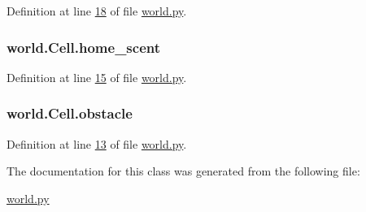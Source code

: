 Definition at line \hyperlink{world_8py_source_l00018}{18} of file \hyperlink{world_8py_source}{world.\+py}.

\hypertarget{classworld_1_1Cell_a0ef4adaadea1ccdcd1b61c70e242aa4a}{
\subsubsection[{home\+\_\+scent}]{\setlength{\rightskip}{0pt plus 5cm}world.\+Cell.\+home\+\_\+scent}}\label{classworld_1_1Cell_a0ef4adaadea1ccdcd1b61c70e242aa4a}


Definition at line \hyperlink{world_8py_source_l00015}{15} of file \hyperlink{world_8py_source}{world.\+py}.

\hypertarget{classworld_1_1Cell_aeaf17388b8c9000fe612ab043418825c}{
\subsubsection[{obstacle}]{\setlength{\rightskip}{0pt plus 5cm}world.\+Cell.\+obstacle}}\label{classworld_1_1Cell_aeaf17388b8c9000fe612ab043418825c}


Definition at line \hyperlink{world_8py_source_l00013}{13} of file \hyperlink{world_8py_source}{world.\+py}.



The documentation for this class was generated from the following file\+:\begin{DoxyCompactItemize}
\item 
\hyperlink{world_8py}{world.\+py}\end{DoxyCompactItemize}
